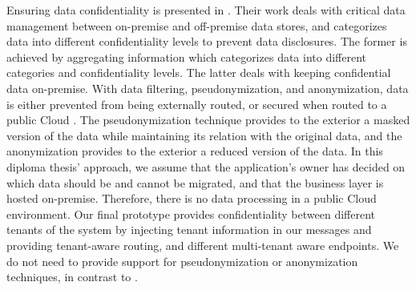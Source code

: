 
Ensuring data confidentiality is presented in \cite{strauch2012}. Their work deals with critical data management between on-premise and off-premise data stores, and categorizes data into different confidentiality levels to prevent data disclosures. The former is achieved by aggregating information which categorizes data into different categories and confidentiality levels. The latter deals with keeping confidential data on-premise. With data filtering, pseudonymization, and anonymization, data is either prevented from being externally routed, or secured when routed to a public Cloud \cite{strauch2012}. The pseudonymization technique provides to the exterior a masked version of the data while maintaining its relation with the original data, and the anonymization provides to the exterior a reduced version of the data. In this diploma thesis' approach, we assume that the application's owner has decided on which data should be and cannot be migrated, and that the business layer is hosted on-premise. Therefore, there is no data processing in a public Cloud environment. Our final prototype provides confidentiality between different tenants of the system by injecting tenant information  in our messages and providing tenant-aware routing, and different multi-tenant aware endpoints. We do not need to provide support for pseudonymization or anonymization techniques, in contrast to \cite{strauch2012}.

